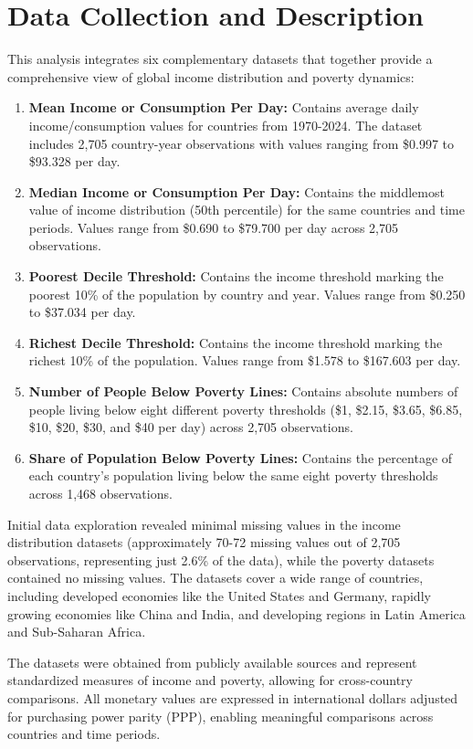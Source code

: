 \documentclass[12pt,a4paper]{article}
\begin{document}
\section{Data Collection and Description}\label{sec:data}
This analysis integrates six complementary datasets that together provide a comprehensive view of global income distribution and poverty dynamics:
\begin{enumerate}
    \item \textbf{Mean Income or Consumption Per Day:} Contains average daily income/consumption values for countries from 1970-2024. The dataset includes 2,705 country-year observations with values ranging from \$0.997 to \$93.328 per day.
    \item \textbf{Median Income or Consumption Per Day:} Contains the middlemost value of income distribution (50th percentile) for the same countries and time periods. Values range from \$0.690 to \$79.700 per day across 2,705 observations.
    \item \textbf{Poorest Decile Threshold:} Contains the income threshold marking the poorest 10\% of the population by country and year. Values range from \$0.250 to \$37.034 per day.
    \item \textbf{Richest Decile Threshold:} Contains the income threshold marking the richest 10\% of the population. Values range from \$1.578 to \$167.603 per day.
    \item \textbf{Number of People Below Poverty Lines:} Contains absolute numbers of people living below eight different poverty thresholds (\$1, \$2.15, \$3.65, \$6.85, \$10, \$20, \$30, and \$40 per day) across 2,705 observations.
    \item \textbf{Share of Population Below Poverty Lines:} Contains the percentage of each country's population living below the same eight poverty thresholds across 1,468 observations.
\end{enumerate}

Initial data exploration revealed minimal missing values in the income distribution datasets (approximately 70-72 missing values out of 2,705 observations, representing just 2.6\% of the data), while the poverty datasets contained no missing values. The datasets cover a wide range of countries, including developed economies like the United States and Germany, rapidly growing economies like China and India, and developing regions in Latin America and Sub-Saharan Africa.

The datasets were obtained from publicly available sources \cite{hasell2022poverty} and represent standardized measures of income and poverty, allowing for cross-country comparisons. All monetary values are expressed in international dollars adjusted for purchasing power parity (PPP), enabling meaningful comparisons across countries and time periods.
\end{document}
